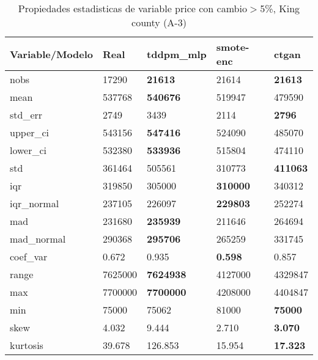 \begin{table}[H]
\centering
\fontsize{8}{14}\selectfont
\caption{Propiedades estadisticas de variable price con cambio\ensuremath{>}5\%, King county (A-3)}
\label{table-stats-king county-a-3-price-short}
\begin{tabular}{|l|m{10em}|m{10em}|m{10em}|m{10em}|}
\hline
 \rowcolor[gray]{0.8}
Variable/Modelo & Real & tddpm\_mlp & smote-enc & ctgan \\
\hline nobs & 17290 & \bfseries 21613 & \cellcolor[rgb]{0.9, 0.54, 0.52} 21614 & \bfseries 21613 \\
\hline mean & 537768 & \bfseries 540676 & 519947 & \cellcolor[rgb]{0.9, 0.54, 0.52} 479590 \\
\hline std\_err & 2749 & \cellcolor[rgb]{0.9, 0.54, 0.52} 3439 & 2114 & \bfseries 2796 \\
\hline upper\_ci & 543156 & \bfseries 547416 & 524090 & \cellcolor[rgb]{0.9, 0.54, 0.52} 485070 \\
\hline lower\_ci & 532380 & \bfseries 533936 & 515804 & \cellcolor[rgb]{0.9, 0.54, 0.52} 474110 \\
\hline std & 361464 & \cellcolor[rgb]{0.9, 0.54, 0.52} 505561 & 310773 & \bfseries 411063 \\
\hline iqr & 319850 & 305000 & \bfseries 310000 & \cellcolor[rgb]{0.9, 0.54, 0.52} 340312 \\
\hline iqr\_normal & 237105 & 226097 & \bfseries 229803 & \cellcolor[rgb]{0.9, 0.54, 0.52} 252274 \\
\hline mad & 231680 & \bfseries 235939 & 211646 & \cellcolor[rgb]{0.9, 0.54, 0.52} 264694 \\
\hline mad\_normal & 290368 & \bfseries 295706 & 265259 & \cellcolor[rgb]{0.9, 0.54, 0.52} 331745 \\
\hline coef\_var & 0.672 & \cellcolor[rgb]{0.9, 0.54, 0.52} 0.935 & \bfseries 0.598 & 0.857 \\
\hline range & 7625000 & \bfseries 7624938 & \cellcolor[rgb]{0.9, 0.54, 0.52} 4127000 & 4329847 \\
\hline max & 7700000 & \bfseries 7700000 & \cellcolor[rgb]{0.9, 0.54, 0.52} 4208000 & 4404847 \\
\hline min & 75000 & 75062 & \cellcolor[rgb]{0.9, 0.54, 0.52} 81000 & \bfseries 75000 \\
\hline skew & 4.032 & \cellcolor[rgb]{0.9, 0.54, 0.52} 9.444 & 2.710 & \bfseries 3.070 \\
\hline kurtosis & 39.678 & \cellcolor[rgb]{0.9, 0.54, 0.52} 126.853 & 15.954 & \bfseries 17.323 \\

\end{tabular}
\end{table}
